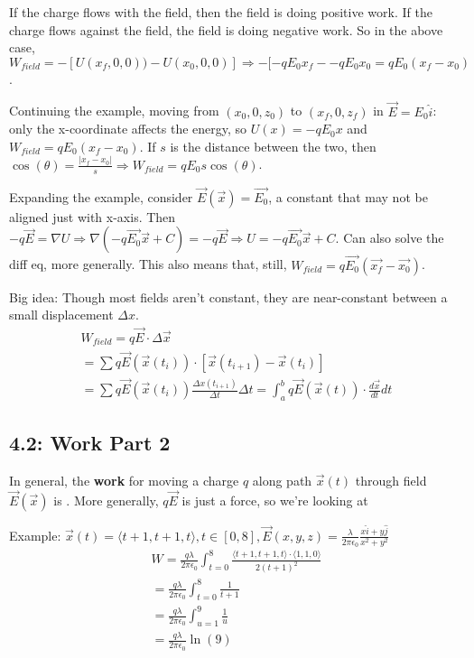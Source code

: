 \documentclass[11pt, oneside]{article}   	%
\begin{document}
 If the charge flows with the field, then the field is doing positive work.  If the charge flows against the field, the field is doing negative work.  So in the above case, $W_{field} = -[U(x_f,0,0) )- U(x_0, 0, 0)]  \Rightarrow -[-qE_0x_f - -qE_0x_0 = qE_0(x_f - x_0)$.

Continuing the example, moving from $(x_0,0, z_0) $ to $(x_f,0, z_f)$ in $\vec{E} = E_0\hat{i}$: only the x-coordinate affects the energy, so $U(x) = -qE_0x$ and $W_{field} = qE_0(x_f - x_0)$.  If $s$ is the distance between the two, then $\cos(\theta) = \frac{|x_f - x_0|}{s} \Rightarrow W_{field} = qE_0 s \cos(\theta)$.

Expanding the example, consider $\vec{E}(\vec{x}) = \vec{E_0}$, a constant that may not be aligned just with x-axis.  Then $-q\vec{E} = \nabla U \Rightarrow \nabla (-q\vec{E_0} \vec{x} + C) = -q\vec{E} \Rightarrow U = -q \vec{E_0}\vec{x} +C.$ Can also solve the diff eq, more generally.  This also means that, still, $W_{field} = q\vec{E_0}(\vec{x_f} - \vec{x_0})$.

Big idea: Though most fields aren't constant, they are near-constant between a small displacement $\Delta x$.  
\begin{align}
W_{field} = q\vec{E} \cdot \Delta \vec{x} \\
= \sum q\vec{E}(\vec{x}(t_i)) \cdot [\vec{x}(t_{i+1}) - \vec{x}(t_i)] \\
= \sum q\vec{E}(\vec{x}(t_i)) \frac{\Delta x(t_{i+1})} {\Delta t}\Delta t 
= \int_a^b q \vec{E}(\vec{x}(t)) \cdot \frac{d\vec{x}}{dt}dt
\end{align}


\subsection{4.2: Work Part 2}

In general, the \textbf{work} for moving a charge $q$ along path $\vec{x}(t)$ through field $\vec{E}(\vec{x})$ is .  More generally, $q\vec{E}$ is just a force, so we're looking at 

Example: $\vec{x}(t) = \langle t+1, t+1, t \rangle, t \in [0, 8], \vec{E}(x,y,z) = \frac{\lambda}{2 \pi \epsilon_0} \frac{x \hat{i} + y \hat{j}}{x^2+y^2}$
\begin{align}
W = \frac{q \lambda}{2 \pi \epsilon_0} \int_{t=0}^8 \frac{\langle t+1, t+1, t\rangle \cdot \langle 1, 1, 0 \rangle}{2(t+1)^2} \\
=\frac{q \lambda}{2 \pi \epsilon_0} \int_{t=0}^8 \frac{1}{t+1} \\
= \frac{q \lambda}{2 \pi \epsilon_0} \int_{u=1}^9 \frac{1}{u}  \\
= \frac{q \lambda}{2 \pi \epsilon_0} \ln(9)
\end{align}
\end{document}
